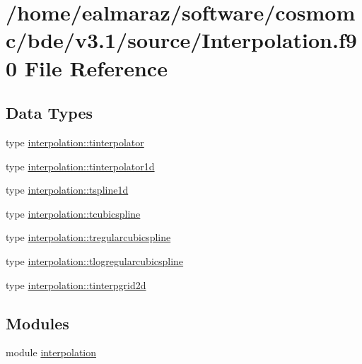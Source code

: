 \hypertarget{Interpolation_8f90}{}\section{/home/ealmaraz/software/cosmomc/bde/v3.1/source/\+Interpolation.f90 File Reference}
\label{Interpolation_8f90}
\subsection*{Data Types}
\begin{DoxyCompactItemize}
\item 
type \mbox{\hyperlink{structinterpolation_1_1tinterpolator}{interpolation\+::tinterpolator}}
\item 
type \mbox{\hyperlink{structinterpolation_1_1tinterpolator1d}{interpolation\+::tinterpolator1d}}
\item 
type \mbox{\hyperlink{structinterpolation_1_1tspline1d}{interpolation\+::tspline1d}}
\item 
type \mbox{\hyperlink{structinterpolation_1_1tcubicspline}{interpolation\+::tcubicspline}}
\item 
type \mbox{\hyperlink{structinterpolation_1_1tregularcubicspline}{interpolation\+::tregularcubicspline}}
\item 
type \mbox{\hyperlink{structinterpolation_1_1tlogregularcubicspline}{interpolation\+::tlogregularcubicspline}}
\item 
type \mbox{\hyperlink{structinterpolation_1_1tinterpgrid2d}{interpolation\+::tinterpgrid2d}}
\end{DoxyCompactItemize}
\subsection*{Modules}
\begin{DoxyCompactItemize}
\item 
module \mbox{\hyperlink{namespaceinterpolation}{interpolation}}
\end{DoxyCompactItemize}
